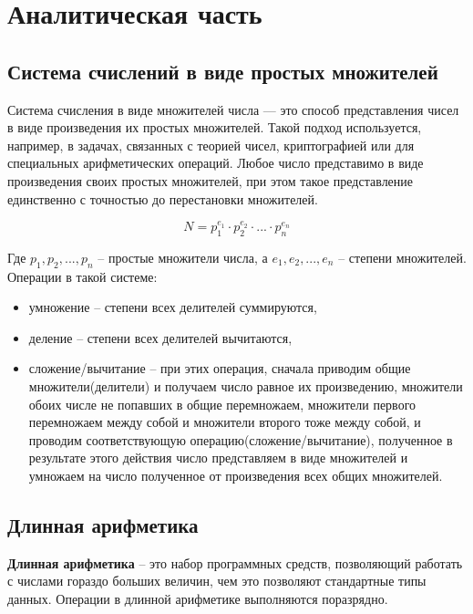 \chapter{Аналитическая часть}
\section{Система счислений в виде простых множителей}
Система счисления в виде множителей числа --- это способ представления чисел в виде произведения их простых множителей. Такой подход используется, например, в задачах, связанных с теорией чисел, криптографией или для специальных арифметических операций. Любое число представимо в виде произведения своих простых множителей, при этом такое представление единственно с точностью до перестановки множителей.

\begin{equation}
	N = p_1^{e_1}\cdot p_2^{e_2}\cdot...\cdot p_n^{e_n}
\end{equation}

Где $p_1, p_2,...,p_n$ -- простые множители числа, а  $e_1, e_2,...,e_n$ -- степени множителей.
Операции в такой системе:
\begin{itemize}
	\item умножение -- степени всех делителей суммируются,
	\item деление -- степени всех делителей вычитаются,
	\item сложение/вычитание -- при этих операция, сначала приводим общие множители(дел\-ители) и получаем число равное их произведению, множители обоих числе не попавших в общие перемножаем, множители первого перемножаем между собой и множители второго тоже между собой, и проводим соответствующую операцию(сложение/вычитание), полученное в результате этого действия число представляем в виде множителей и умножаем на число полученное от произведения всех общих множителей.
\end{itemize}

\section{Длинная арифметика}
\textbf{Длинная арифметика} -- это набор программных средств, позволяющий работать с числами гораздо больших величин, чем это позволяют стандартные типы данных. Операции в длинной арифметике выполняются поразрядно. 
\clearpage
